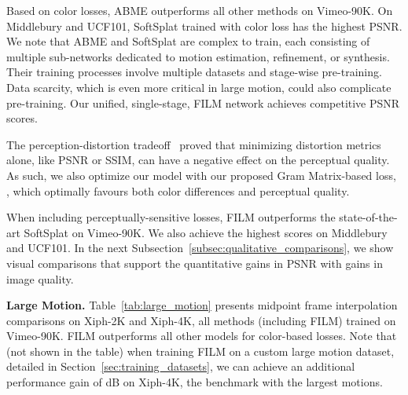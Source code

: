 \documentclass[runningheads]{llncs}
\newcommand{\Table}[1]{Table~\ref{tab:#1}}
\begin{document}
Based on color losses, ABME outperforms all other methods on Vimeo-90K. On Middlebury and UCF101, SoftSplat trained with color loss has the highest PSNR. We note that ABME and SoftSplat are complex to train, each consisting of multiple sub-networks dedicated to motion estimation, refinement, or synthesis. Their training processes involve multiple datasets and stage-wise pre-training. Data scarcity, which is even more critical in large motion, could also complicate pre-training. Our unified, single-stage, FILM network achieves competitive PSNR scores.

The perception-distortion tradeoff~\cite{perception_tradeoff} proved that minimizing distortion metrics alone, like PSNR or SSIM, can have a negative effect on the perceptual quality. As such, we also optimize our model with our proposed Gram Matrix-based loss, , which optimally favours both color differences and perceptual quality. 

When including perceptually-sensitive losses, FILM outperforms the state-of-the-art SoftSplat on Vimeo-90K. We also achieve the highest scores on Middlebury and UCF101. In the next Subsection~\ref{subsec:qualitative_comparisons}, we show visual comparisons that support the quantitative gains in PSNR with gains in image quality.

\vspace{0.05in}
\noindent\textbf{Large Motion.} 
\Table{large_motion} presents midpoint frame interpolation comparisons on Xiph-2K and Xiph-4K, all methods (including FILM) trained on Vimeo-90K.  FILM outperforms all other models for color-based losses. Note that (not shown in the table) when training FILM on a custom large motion dataset, detailed in Section~\ref{sec:training_datasets}, we can achieve an additional performance gain of dB on Xiph-4K, the benchmark with the largest motions.
\end{document}
